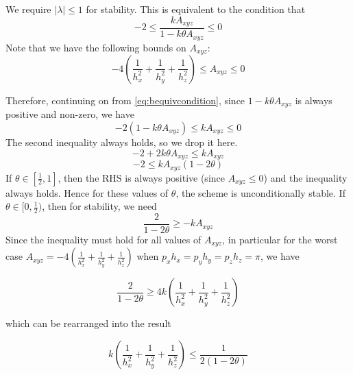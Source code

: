 \documentclass{article}
\numberwithin{equation}{section}
\theoremstyle{definition}
\begin{document}
We require $|\lambda| \leq 1$ for stability. This is equivalent to the condition that 
\begin{equation}
    \label{eq:bequivcondition}
    -2 \leq \frac{kA_{xyz}}{1 - k \theta  A_{xyz}} \leq 0
\end{equation}
Note that we have the following bounds on $A_{xyz}$:
\begin{equation}
    -4 \left( \frac{1}{h_x^2} +
    \frac{1}{h_y^2} +
    \frac{1}{h_z^2}\right) \leq A_{xyz} \leq 0
\end{equation}

Therefore, continuing on from \eqref{eq:bequivcondition}, since $1 - k \theta  A_{xyz}$ is always positive and non-zero, we have
\begin{equation}
    -2(1 - k \theta  A_{xyz})\leq kA_{xyz} \leq 0
\end{equation}
The second inequality always holds, so we drop it here.
\begin{equation}
    -2 + 2 k \theta  A_{xyz}\leq kA_{xyz}
\end{equation}
\begin{equation}
    -2 \leq kA_{xyz} (1- 2\theta)
\end{equation}
If $\theta \in [\frac 12, 1]$, then the RHS is always positive (since $A_{xyz} \leq 0$) and the inequality always holds. Hence for these values of $\theta$, the scheme is unconditionally stable.
If $\theta \in [0, \frac 12)$, then for stability, we need
\begin{equation}
    \frac{2}{1- 2\theta} \geq -kA_{xyz} 
\end{equation}
Since the inequality must hold for all values of $A_{xyz}$, in particular for the worst case $A_{xyz} = -4 \left( \frac{1}{h_x^2} +
\frac{1}{h_y^2} +
\frac{1}{h_z^2}\right)$ when $p_x h_x = p_y h_y = p_z h_z = \pi$, we have

\begin{equation}
    \frac{2}{1- 2\theta} \geq 4k \left( \frac{1}{h_x^2} +
    \frac{1}{h_y^2} +
    \frac{1}{h_z^2}\right)
\end{equation}

which can be rearranged into the result

\begin{equation}
    k \left( \frac{1}{h_x^2} +
    \frac{1}{h_y^2} +
    \frac{1}{h_z^2}\right) \leq \frac{1}{2(1- 2\theta)}
\end{equation}
\end{document}

